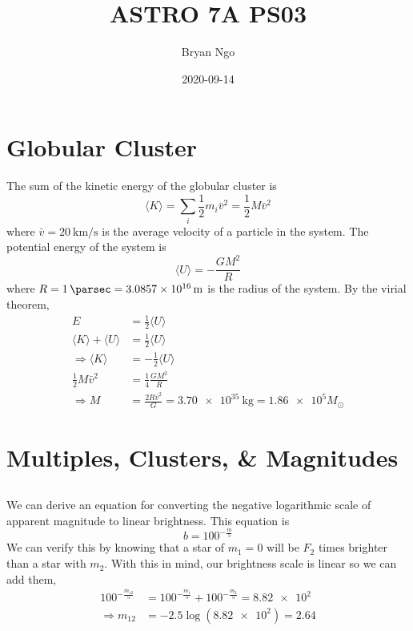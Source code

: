 \documentclass{article}
\title{ASTRO 7A PS03}
\author{Bryan Ngo}
\date{2020-09-14}
\begin{document}
\maketitle

\section{Globular Cluster}

The sum of the kinetic energy of the globular cluster is
\begin{equation}
    \langle K \rangle = \sum_i \frac{1}{2} m_i \bar{v}^2 = \frac{1}{2} M \bar{v}^2
\end{equation}
where \(\bar{v} = \SI{20}{\kilo\meter\per\second}\) is the average velocity of a particle in the system.
The potential energy of the system is
\begin{equation}
    \langle U \rangle = -\frac{G M^2}{R}
\end{equation}
where \(R = \SI{1}{\parsec} = \SI{3.0857e+16}{\meter}\) is the radius of the system.
By the virial theorem,
\begin{align}
    E &= \frac{1}{2} \langle U \rangle \\
    \langle K \rangle + \langle U \rangle &= \frac{1}{2} \langle U \rangle \\
    \Rightarrow \langle K \rangle &= -\frac{1}{2} \langle U \rangle \\
    \frac{1}{2} M \bar{v}^2 &= \frac{1}{4} \frac{G M^2}{R} \\
    \Rightarrow M &= \frac{2 R \bar{v}^2}{G} = \SI{3.70e+35}{\kilogram} = \num{1.86e+5} M_\odot
\end{align}

\section{Multiples, Clusters, \& Magnitudes}

\subsection{}

We can derive an equation for converting the negative logarithmic scale of apparent magnitude to linear brightness.
This equation is
\begin{equation}
    b = 100^{-\frac{m}{5}}
\end{equation}
We can verify this by knowing that a star of \(m_1 = 0\) will be \(F_2\) times brighter than a star with \(m_2\).
With this in mind, our brightness scale is linear so we can add them,
\begin{align}
    100^{-\frac{m_{12}}{5}} &= 100^{-\frac{m_1}{5}} + 100^{-\frac{m_2}{5}} = \num{8.82e+2} \\
    \Rightarrow m_{12} &= -2.5 \log(\num{8.82e+2}) = \num{2.64}
\end{align}
\end{document}
